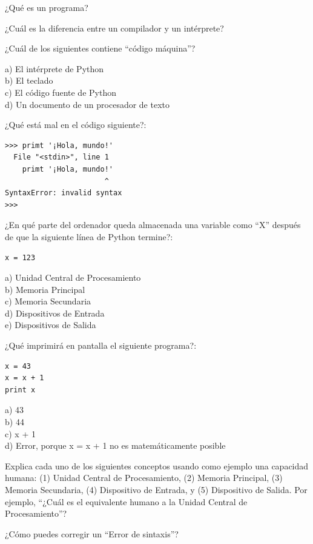 \begin{ex}
¿Qué es un programa?
\end{ex}

\begin{ex}
¿Cuál es la diferencia entre un compilador y un intérprete?
\end{ex}

\begin{ex}
¿Cuál de los siguientes contiene ``código máquina''?

a) El intérprete de Python\\
b) El teclado\\
c) El código fuente de Python\\
d) Un documento de un procesador de texto
\end{ex}

\begin{ex}
¿Qué está mal en el código siguiente?:

\beforeverb
\begin{verbatim}
>>> primt '¡Hola, mundo!'
  File "<stdin>", line 1
    primt '¡Hola, mundo!'
                       ^
SyntaxError: invalid syntax
>>> 
\end{verbatim}
\afterverb

\end{ex}

\begin{ex}
¿En qué parte del ordenador queda almacenada una variable como ``X''
después de que la siguiente línea de Python termine?:

\beforeverb
\begin{verbatim}
x = 123
\end{verbatim}
\afterverb
%
a) Unidad Central de Procesamiento\\
b) Memoria Principal\\
c) Memoria Secundaria\\
d) Dispositivos de Entrada\\
e) Dispositivos de Salida
\end{ex}

\begin{ex}
¿Qué imprimirá en pantalla el siguiente programa?:

\beforeverb
\begin{verbatim}
x = 43
x = x + 1
print x
\end{verbatim}
\afterverb
%
a) 43\\
b) 44\\
c) x + 1\\
d) Error, porque x = x + 1 no es matemáticamente posible
\end{ex}

\begin{ex}
Explica cada uno de los siguientes conceptos usando como ejemplo una capacidad humana:
(1) Unidad Central de Procesamiento, (2) Memoria Principal, (3) Memoria Secundaria, 
(4) Dispositivo de Entrada, y
(5) Dispositivo de Salida.
Por ejemplo, ``¿Cuál es el equivalente humano a la Unidad Central de Procesamiento''? 
\end{ex}

\begin{ex}
¿Cómo puedes corregir un ``Error de sintaxis''?
\end{ex}

